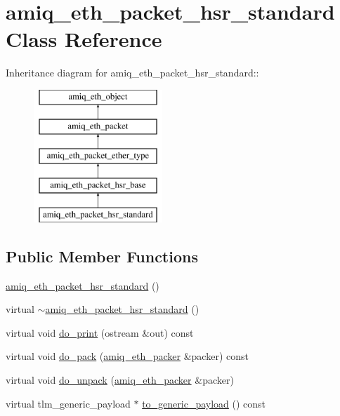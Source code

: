 \hypertarget{classamiq__eth__packet__hsr__standard}{
\section{amiq\_\-eth\_\-packet\_\-hsr\_\-standard Class Reference}
\label{classamiq__eth__packet__hsr__standard}
}
Inheritance diagram for amiq\_\-eth\_\-packet\_\-hsr\_\-standard::\begin{figure}[H]
\begin{center}
\leavevmode
\includegraphics[height=5cm]{classamiq__eth__packet__hsr__standard}
\end{center}
\end{figure}
\subsection*{Public Member Functions}
\begin{DoxyCompactItemize}
\item 
\hyperlink{classamiq__eth__packet__hsr__standard_ace3c49d093728ce7571f30c3ab5d3e83}{amiq\_\-eth\_\-packet\_\-hsr\_\-standard} ()
\item 
virtual \hyperlink{classamiq__eth__packet__hsr__standard_a0a708cd8f8aef3f459ce8efe1e6ff935}{$\sim$amiq\_\-eth\_\-packet\_\-hsr\_\-standard} ()
\item 
virtual void \hyperlink{classamiq__eth__packet__hsr__standard_abaa39d881f90e05ae4acbb7fe5ebca0d}{do\_\-print} (ostream \&out) const 
\item 
virtual void \hyperlink{classamiq__eth__packet__hsr__standard_a1dce9b763e3222c2fe257b15df912514}{do\_\-pack} (\hyperlink{classamiq__eth__packer}{amiq\_\-eth\_\-packer} \&packer) const 
\item 
virtual void \hyperlink{classamiq__eth__packet__hsr__standard_aac95578ea89db3bd0ec190ca87e731c8}{do\_\-unpack} (\hyperlink{classamiq__eth__packer}{amiq\_\-eth\_\-packer} \&packer)
\item 
virtual tlm\_\-generic\_\-payload $\ast$ \hyperlink{classamiq__eth__packet__hsr__standard_aa145fe8cc2731124d2c9e0bfb61bacf2}{to\_\-generic\_\-payload} () const 
\end{DoxyCompactItemize}
